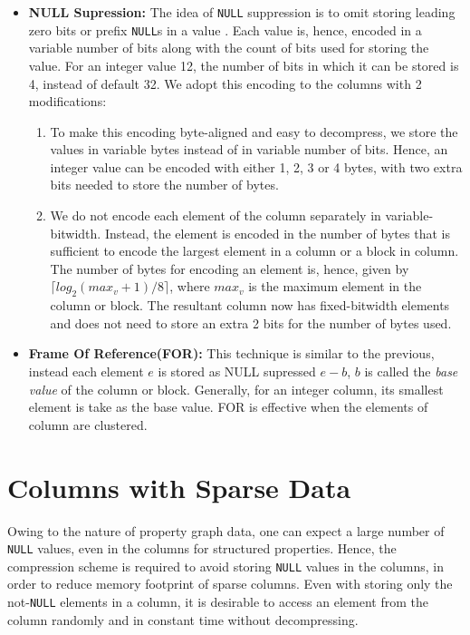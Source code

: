 \begin{itemize}
	\item \textbf{NULL Supression:} The idea of \texttt{NULL} suppression is to omit storing leading zero bits or prefix \texttt{NULL}s in a value \cite{beckmann:sparse}. Each value is, hence, encoded in a variable number of bits along with the count of bits used for storing the value. For an integer value 12, the number of bits in which it can be stored is 4, instead of default 32. We adopt this encoding to the columns with 2 modifications:
	\begin{enumerate}
		\item To make this encoding byte-aligned and easy to decompress, we store the values in variable bytes instead of in variable number of bits. Hence, an integer value can be encoded with either 1, 2, 3 or 4 bytes, with two extra bits needed to store the number of bytes. 
		\item We do not encode each element of the column separately in variable-bitwidth. Instead, the element is encoded in the number of bytes that is sufficient to encode the largest element in a column or a block in column. The number of bytes for encoding an element is, hence, given by $\lceil log_2(max_v+1)/8\rceil$, where $max_v$ is the maximum element in the column or block. The resultant column now has fixed-bitwidth elements and does not need to store an extra 2 bits for the number of bytes used.
	\end{enumerate}

	\item \textbf{Frame Of Reference(FOR): }This technique is similar to the previous, instead each element $e$ is stored as NULL supressed $e-b$, $b$ is called the \emph{base value} of the column or block. Generally, for an integer column, its smallest element is take as the base value. FOR is effective when the elements of column are clustered.
	
\end{itemize}

\section{Columns with Sparse Data}
\label{sec:sparse}

Owing to the nature of property graph data, one can expect a large number of \texttt{NULL} values, even in the columns for structured properties. Hence, the compression scheme is required to avoid storing \texttt{NULL} values in the columns, in order to reduce memory footprint of sparse columns. Even with storing only the not-\texttt{NULL} elements in a column, it is desirable to access an element from the column randomly and in constant time without decompressing. 

